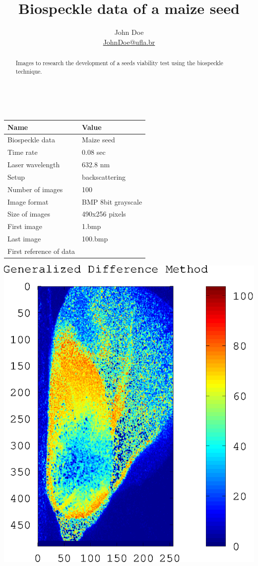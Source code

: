 \documentclass[a4paper,10pt]{article}
\title{Biospeckle data of a maize seed}
\author{John Doe \\ \href{mailto:JohnDoe@deg.ufla.br}{JohnDoe@ufla.br} }
\begin{document}
\maketitle

\begin{abstract}
Images to research the development of a seeds viability test using the biospeckle technique.
\end{abstract}
~
\begin{minipage}[c]{0.5\textwidth}
\begin{tabular}{l |l}
\hline
\textbf{Name} 	& \textbf{Value}  \\ \hline \hline	
Biospeckle data	& Maize seed\\
Time rate	& 0.08 sec\\
Laser wavelength& 632.8 nm \\ 
Setup		& backscattering\\ 
\hline
Number of images& 100\\ 
Image format	& BMP 8bit grayscale \\
Size of images	& 490x256 pixels\\
\hline
First image	& 1.bmp\\ 
Last image	& 100.bmp\\ 
\hline
First reference of data	& \cite{ref1} \\ 
\hline
\end{tabular}
\end{minipage}
\begin{minipage}[c]{0.5\textwidth}
\begin{center}
\includegraphics[width=0.6\linewidth]{example/testgendiff.eps}
\end{center}
\end{minipage}
\end{document}
